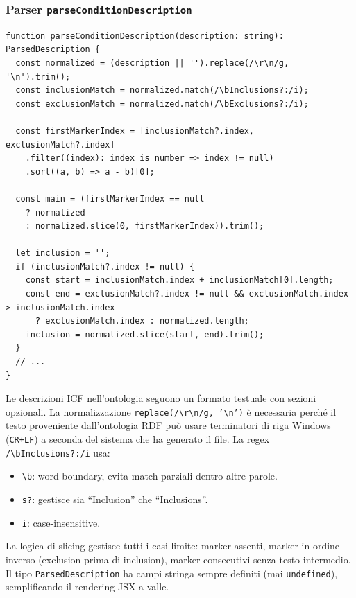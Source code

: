\documentclass[a4paper,12pt]{article}
\begin{document}
\subsubsection{Parser \texttt{parseConditionDescription}}

\begin{lstlisting}
function parseConditionDescription(description: string): ParsedDescription {
  const normalized = (description || '').replace(/\r\n/g, '\n').trim();
  const inclusionMatch = normalized.match(/\bInclusions?:/i);
  const exclusionMatch = normalized.match(/\bExclusions?:/i);

  const firstMarkerIndex = [inclusionMatch?.index, exclusionMatch?.index]
    .filter((index): index is number => index != null)
    .sort((a, b) => a - b)[0];

  const main = (firstMarkerIndex == null
    ? normalized
    : normalized.slice(0, firstMarkerIndex)).trim();

  let inclusion = '';
  if (inclusionMatch?.index != null) {
    const start = inclusionMatch.index + inclusionMatch[0].length;
    const end = exclusionMatch?.index != null && exclusionMatch.index > inclusionMatch.index
      ? exclusionMatch.index : normalized.length;
    inclusion = normalized.slice(start, end).trim();
  }
  // ...
}
\end{lstlisting}

\noindent Le descrizioni ICF nell'ontologia seguono un formato testuale con
sezioni opzionali. La normalizzazione \texttt{replace(/\textbackslash r\textbackslash n/g, '\textbackslash n')} \`{e}
necessaria perch\'{e} il testo proveniente dall'ontologia RDF pu\`{o}
usare terminatori di riga Windows (\texttt{CR+LF}) a seconda del
sistema che ha generato il file. La regex \texttt{/\textbackslash bInclusions?:/i} usa:
\begin{itemize}[noitemsep]
  \item \texttt{\textbackslash b}: word boundary, evita match parziali dentro altre parole.
  \item \texttt{s?}: gestisce sia ``Inclusion'' che ``Inclusions''.
  \item \texttt{i}: case-insensitive.
\end{itemize}
La logica di slicing gestisce tutti i casi limite: marker assenti,
marker in ordine inverso (exclusion prima di inclusion), marker
consecutivi senza testo intermedio. Il tipo \texttt{ParsedDescription}
ha campi stringa sempre definiti (mai \texttt{undefined}), semplificando
il rendering JSX a valle.
\end{document}
